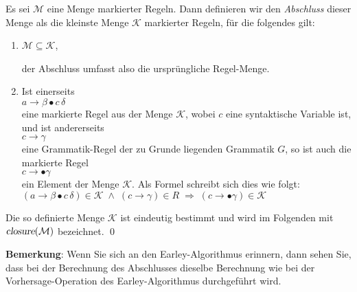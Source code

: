 \begin{Definition}
  Es sei $\mathcal{M}$ eine Menge markierter Regeln.  Dann definieren wir den \emph{Abschluss} dieser Menge
  als die kleinste Menge $\mathcal{K}$ markierter Regeln, f\"ur die folgendes gilt:
  \begin{enumerate}
  \item $\mathcal{M} \subseteq \mathcal{K}$,

        der Abschluss umfasst also die urspr\"ungliche Regel-Menge.
  \item Ist einerseits
        \\[0.2cm]
        \hspace*{1.3cm}
        $a \rightarrow \beta \bullet c\, \delta$
        \\[0.2cm]
        eine markierte Regel aus der Menge $\mathcal{K}$, wobei $c$ eine syntaktische
        Variable ist, und ist andererseits
        \\[0.2cm]
        \hspace*{1.3cm}
        $c \rightarrow \gamma$
        \\[0.2cm]
        eine Grammatik-Regel der zu Grunde liegenden Grammatik $G$, so ist auch die markierte
        Regel 
        \\[0.2cm]
        \hspace*{1.3cm}
        $c \rightarrow \bullet \gamma$
        \\[0.2cm]
        ein Element der Menge $\mathcal{K}$.  Als Formel schreibt sich dies wie folgt:
        \\[0.2cm]
        \hspace*{1.3cm}
        $(a \rightarrow \beta \bullet c\, \delta) \in \mathcal{K} 
         \;\wedge\; 
         (c \rightarrow \gamma) \in R
         \;\Rightarrow\; (c \rightarrow \bullet \gamma) \in \mathcal{K}
        $
  \end{enumerate}
  Die so definierte Menge $\mathcal{K}$ ist eindeutig bestimmt und wird im Folgenden mit
  $\textsl{closure}(\mathcal{M})$ bezeichnet. \qed
\end{Definition}

\noindent
\textbf{Bemerkung}: Wenn Sie sich an den Earley-Algorithmus erinnern, dann sehen Sie, dass bei der
Berechnung des Abschlusses dieselbe Berechnung wie bei der Vorhersage-Operation
des  Earley-Algorithmus durchgef\"uhrt wird.  \eox
\vspace*{0.3cm}

